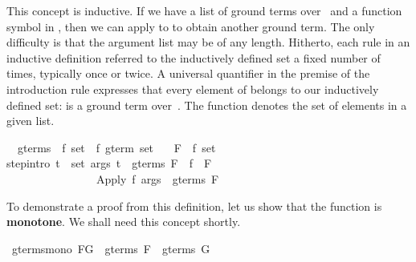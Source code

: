 \begin{isabellebody}
\begin{isamarkuptext}
This concept is inductive. If we have a list  of ground terms 
over~ and a function symbol  in , then we 
can apply  to  to obtain another ground term. 
The only difficulty is that the argument list may be of any length. Hitherto, 
each rule in an inductive definition referred to the inductively 
defined set a fixed number of times, typically once or twice. 
A universal quantifier in the premise of the introduction rule 
expresses that every element of  belongs
to our inductively defined set: is a ground term 
over~.  The function  denotes the set of elements in a given 
list.%
\end{isamarkuptext}%
\isamarkuptrue%
\isamarkupfalse%
\isanewline
\ \ gterms\ {}{}\ {}{}f\ set\ {}\ {}f\ gterm\ set{}\isanewline
\ \ \ F\ {}{}\ {}{}f\ set{}\isanewline
{}\isanewline
step{}intro{}{}{}\ {}{}{}t\ {}\ set\ args{}\ t\ {}\ gterms\ F{}\ \ f\ {}\ F{}\isanewline
\ \ \ \ \ \ \ \ \ \ \ \ \ \ \ {}\ {}Apply\ f\ args{}\ {}\ gterms\ F{}%
\begin{isamarkuptext}%
To demonstrate a proof from this definition, let us 
show that the function 
is \textbf{monotone}.  We shall need this concept shortly.%
\end{isamarkuptext}%
\isamarkuptrue%
\isamarkupfalse%
\ gterms{}mono{}\ {}F{}G\ {}\ gterms\ F\ {}\ gterms\ G{}\isanewline

\end{isabellebody}
